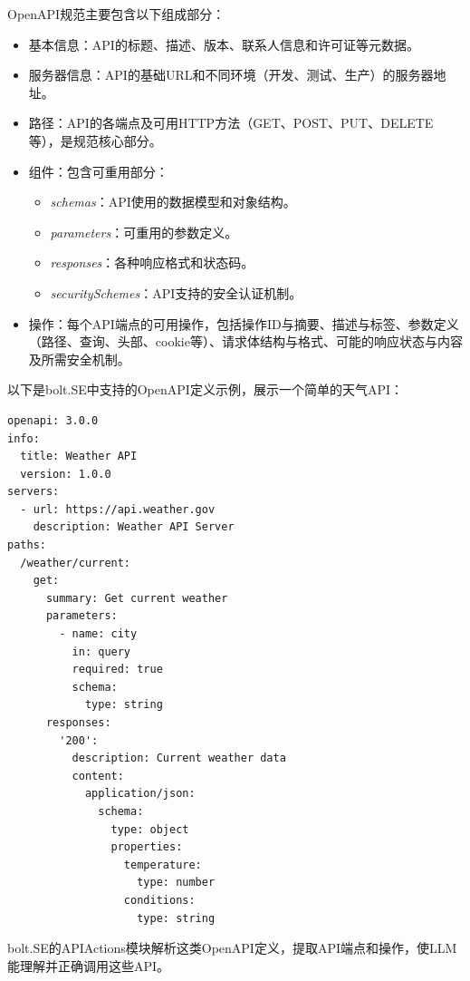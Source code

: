 OpenAPI规范主要包含以下组成部分\cite{openapi2023}：

\begin{itemize}
  \item 基本信息：API的标题、描述、版本、联系人信息和许可证等元数据。
  
  \item 服务器信息：API的基础URL和不同环境（开发、测试、生产）的服务器地址。
  
  \item 路径：API的各端点及可用HTTP方法（GET、POST、PUT、DELETE等），是规范核心部分。
  
  \item 组件：包含可重用部分：
    \begin{itemize}
      \item \textit{schemas}：API使用的数据模型和对象结构。
      \item \textit{parameters}：可重用的参数定义。
      \item \textit{responses}：各种响应格式和状态码。
      \item \textit{securitySchemes}：API支持的安全认证机制。
    \end{itemize}
  
  \item 操作：每个API端点的可用操作，包括操作ID与摘要、描述与标签、参数定义（路径、查询、头部、cookie等）、请求体结构与格式、可能的响应状态与内容及所需安全机制。
\end{itemize}

以下是bolt.SE中支持的OpenAPI定义示例，展示一个简单的天气API：

\begin{verbatim}
openapi: 3.0.0
info:
  title: Weather API
  version: 1.0.0
servers:
  - url: https://api.weather.gov
    description: Weather API Server
paths:
  /weather/current:
    get:
      summary: Get current weather
      parameters:
        - name: city
          in: query
          required: true
          schema:
            type: string
      responses:
        '200':
          description: Current weather data
          content:
            application/json:
              schema:
                type: object
                properties:
                  temperature:
                    type: number
                  conditions:
                    type: string
\end{verbatim}

bolt.SE的APIActions模块解析这类OpenAPI定义，提取API端点和操作，使LLM能理解并正确调用这些API。


